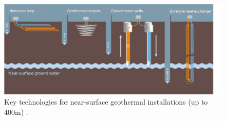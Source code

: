 \begin{figure}
\centering 
\includegraphics[width=\textwidth]{images/Figs/shallow_technologies.png} 
\caption{Key technologies for near-surface geothermal installations (up to 400m) \cite{stmwi_arten_nodate}.}
\label{fig:shallow_gshp} 
\end{figure}


